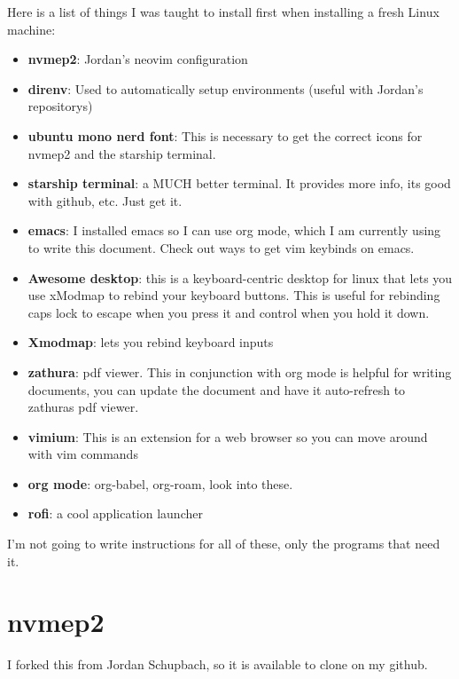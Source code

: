 \documentclass[11pt]{article}
\begin{document}
Here is a list of things I was taught to install first when installing a fresh Linux machine:
\begin{itemize}
\item \textbf{\textbf{nvmep2}}: Jordan's neovim configuration
\item \textbf{\textbf{direnv}}: Used to automatically setup environments (useful with Jordan's repositorys)
\item \textbf{\textbf{ubuntu mono nerd font}}: This is necessary to get the correct icons for nvmep2 and the starship terminal.
\item \textbf{\textbf{starship terminal}}: a MUCH better terminal. It provides more info, its good with github, etc. Just get it.
\item \textbf{\textbf{emacs}}: I installed emacs so I can use org mode, which I am currently using to write this document. Check out ways to get vim keybinds on emacs.
\item \textbf{\textbf{Awesome desktop}}: this is a keyboard-centric desktop for linux that lets you use xModmap to rebind your keyboard buttons. This is useful for rebinding caps lock to escape when you press it and control when you hold it down.
\item \textbf{\textbf{Xmodmap}}: lets you rebind keyboard inputs
\item \textbf{\textbf{zathura}}: pdf viewer. This in conjunction with org mode is helpful for writing documents, you can update the document and have it auto-refresh to zathuras pdf viewer.
\item \textbf{\textbf{vimium}}: This is an extension for a web browser so you can move around with vim commands
\item \textbf{\textbf{org mode}}: org-babel, org-roam, look into these.
\item \textbf{\textbf{rofi}}: a cool application launcher
\end{itemize}
I'm not going to write instructions for all of these, only the programs that need it.





\section{nvmep2}
\label{sec:org569bd85}

I forked this from Jordan Schupbach, so it is available to clone on my github.
\end{document}
